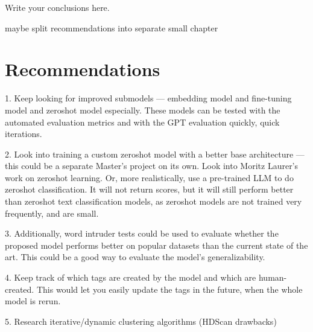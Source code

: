 Write your conclusions here.

maybe split recommendations into separate small chapter

\section{Recommendations}
1. Keep looking for improved submodels — embedding model and fine-tuning model and zeroshot model especially. These models can be tested with the automated evaluation metrics and with the GPT evaluation quickly, quick iterations.

2. Look into training a custom zeroshot model with a better base architecture — this could be a separate Master's project on its own. Look into Moritz Laurer's work on zeroshot learning. Or, more realistically, use a pre-trained LLM to do zeroshot classification. It will not return scores, but it will still perform better than zeroshot text classification models, as zeroshot models are not trained very frequently, and are small.

3. Additionally, word intruder tests could be used to evaluate whether the proposed model performs better on popular datasets than the current state of the art. This could be a good way to evaluate the model's generalizability.

4. Keep track of which tags are created by the model and which are human-created. This would let you easily update the tags in the future, when the whole model is rerun.

5. Research iterative/dynamic clustering algorithms (HDScan drawbacks)